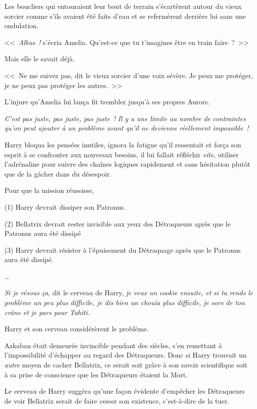 Les boucliers qui entouraient leur bout de terrain s'écartèrent autour du vieux sorcier comme s'ils avaient été faits d'eau et se refermèrent derrière lui sans une ondulation.

<<~\emph{Albus~!} s'écria Amelia. Qu'est-ce que tu t'imagines être en train faire~?~>>

Mais elle le savait déjà.

<<~Ne me suivez pas, dit le vieux sorcier d'une voix sévère. Je peux me protéger, je ne peux pas protéger les autres.~>>

L'injure qu'Amelia lui lança fit trembler jusqu'à ses propres Aurors.

\later

\emph{C'est pas juste, pas juste, pas juste~! Il y a une limite au nombre de contraintes qu'on peut ajouter à un problème avant qu'il ne devienne réellement impossible~!}

Harry bloqua les pensées inutiles, ignora la fatigue qu'il ressentait et força son esprit à se confronter aux nouveaux besoins, il lui fallait réfléchir \emph{vite}, utiliser l'adrénaline pour suivre des chaînes logiques rapidement et sans hésitation plutôt que de la gâcher dans du désespoir.

Pour que la mission réussisse,

(1) Harry devrait dissiper son Patronus.

(2) Bellatrix devrait rester invisible aux yeux des Détraqueurs après que le Patronus aura été dissipé

(3) Harry devrait résister à l'épuisement du Détraquage après que le Patronus aura été dissipé.

…

\emph{Si je résous ça}, dit le cerveau de Harry, \emph{je veux un cookie ensuite, et si tu rends le problème un peu plus difficile, je dis bien un chouïa plus difficile, je sors de ton crâne et je pars pour Tahiti.}

Harry et son cerveau considérèrent le problème.

Azkaban était demeurée invincible pendant des siècles, s'en remettant à l'impossibilité d'échapper au regard des Détraqueurs. Donc si Harry trouvait un \emph{autre} moyen de cacher Bellatrix, ce serait soit grâce à son savoir scientifique soit à sa prise de conscience que les Détraqueurs étaient la Mort.

Le cerveau de Harry suggéra qu'une façon évidente d'empêcher les Détraqueurs de voir Bellatrix serait de faire cesser son existence, c'est-à-dire de la tuer.

